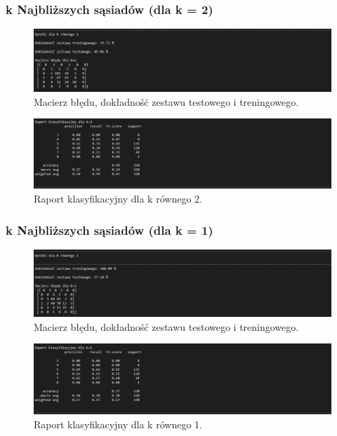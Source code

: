 \documentclass{article}
\begin{document}
\subsubsection{k Najbliższych sąsiadów (dla k = 2)}

\begin{figure}[!htb]
\centering
\includegraphics[width=\textwidth]{image/k_2.png}
\caption{Macierz błędu, dokładność zestawu testowego i treningowego.}
\end{figure}

\begin{figure}[!htb]
\centering
\includegraphics[width=\textwidth]{image/raport_k_2.png}
\caption{Raport klasyfikacyjny dla k równego 2.}
\end{figure}
\newpage
\subsubsection{k Najbliższych sąsiadów (dla k = 1)}

\begin{figure}[!htb]
\centering
\includegraphics[width=\textwidth]{image/k_1.png}
\caption{Macierz błędu, dokładność zestawu testowego i treningowego.}
\end{figure}

\begin{figure}[!htb]
\centering
\includegraphics[width=\textwidth]{image/raport_k_1.png}
\caption{Raport klasyfikacyjny dla k równego 1.}
\end{figure}
\end{document}
